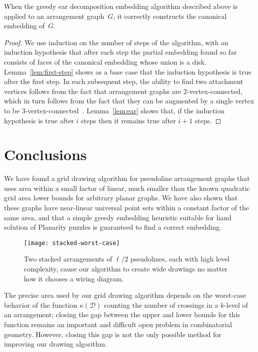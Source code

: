 \documentclass[oribibl]{llncs}
\newcommand{\klevel}{\kappa}
\begin{document}
\begin{theorem}
When the greedy ear decomposition embedding algorithm described above is applied to an arrangement graph~$G$, it correctly constructs the canonical embedding of~$G$.
\end{theorem}

\begin{proof}
We use induction on the number of steps of the algorithm, with an induction hypothesis that after each step the partial embedding found so far consists of faces of the canonical embedding whose union is a disk. Lemma~\ref{lem:first-step} shows as a base case that the induction hypothesis is true after the first step. In each subsequent step, the ability to find two attachment vertices follows from the fact that arrangement graphs are 2-vertex-connected, which in turn follows from the fact that they can be augmented by a single vertex to be 3-vertex-connected~\cite{BosEveWis-IJCGA-03}. Lemma~\ref{lem:ear} shows that, if the induction hypothesis is true after $i$ steps then it remains true after $i+1$ steps. 
\end{proof}

\section{Conclusions}

We have found a grid drawing algorithm for pseudoline arrangement graphs that uses area within a small factor of linear, much smaller than the known quadratic grid area lower bounds for arbitrary planar graphs. We have also shown that these graphs have near-linear universal point sets within a constant factor of the same area, and that a simple greedy embedding heuristic suitable for hand solution of Planarity puzzles is guaranteed to find a correct embedding.

\begin{figure}[t]
\centering\texttt{[image: stacked-worst-case]}
\caption{Two stacked arrangements of $\ell/2$ pseudolines, each with high level complexity, cause our algorithm to create wide drawings no matter how it chooses a wiring diagram.}
\label{fig:stacked-worst-case}
\vspace{-2ex}
\end{figure}

The precise area used by our grid drawing algorithm depends on the worst-case behavior of the function $\klevel({\mathcal D})$ counting the number of crossings in a $k$-level of an arrangement; closing the gap between the upper and lower bounds for this function remains an important and difficult open problem in combinatorial geometry. However, closing this gap is not the only possible method for improving our drawing algorithm.
\end{document}
